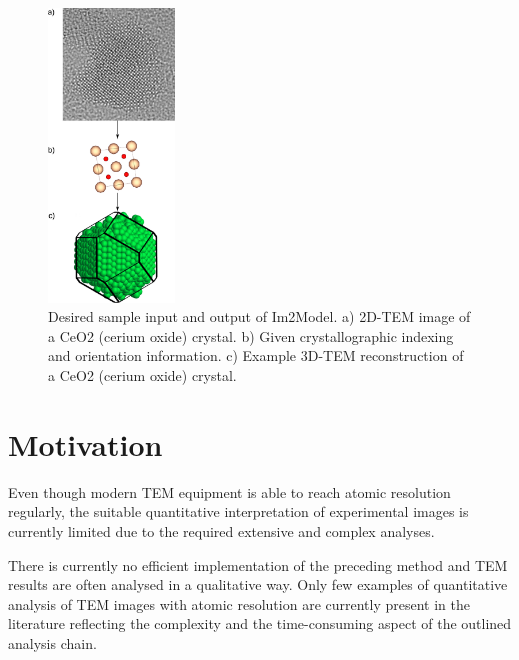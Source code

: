 \documentclass[
  oneside,
  11pt, a4paper,
  footinclude=true,
  headinclude=true,
  cleardoublepage=empty
]{scrbook}
\begin{document}
\begin{figure}[h!]
	\begin{center}
	
	\includegraphics[width=0.3\textwidth]{img/Im2Model_goal.png}
			\caption[Desired sample input and output of Im2Model]{Desired sample input and output of Im2Model.\splitter
			\newline
			a) 2D-TEM image of a CeO2 (cerium oxide) crystal.\newline
			b) Given crystallographic indexing and orientation information.\newline
			c) Example 3D-TEM reconstruction of a CeO2 (cerium oxide) crystal.}
	\label{fig:tem_2_atom_Ce02}
		\end{center}
	\end{figure}
	
 






	\section{Motivation}
	
	Even though modern TEM equipment is able to reach atomic
resolution regularly, the suitable quantitative interpretation of experimental images is currently limited
due to the required extensive and complex analyses.\par 

	There is currently no efficient implementation of the preceding method and TEM results are often analysed in a
qualitative way. 
Only few examples of quantitative analysis of TEM images with atomic resolution are
currently present in the literature %
reflecting the complexity and the time-consuming aspect of the
outlined analysis chain.
\end{document}
